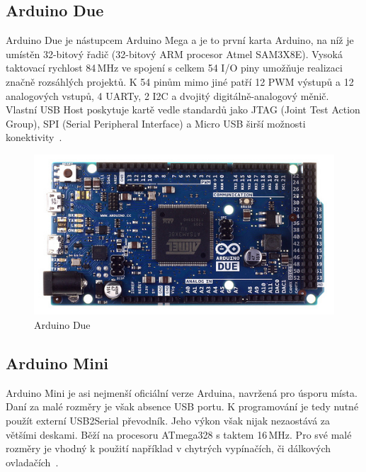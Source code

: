 		\subsection{Arduino Due} 
		Arduino Due je nástupcem Arduino Mega a je to první karta Arduino, na níž je umístěn 32-bitový řadič (32-bitový ARM procesor
		Atmel SAM3X8E). Vysoká taktovací rychlost 84\,MHz ve spojení s celkem 54 I/O piny umožňuje realizaci značně rozsáhlých projektů. K 54 pinům mimo jiné patří 12 PWM výstupů a 12 analogových vstupů, 4 UARTy, 2 I2C a dvojitý digitálně-analogový měnič. Vlastní USB Host poskytuje kartě vedle standardů jako JTAG (Joint Test Action Group), SPI (Serial Peripheral Interface) a Micro USB širší možnosti konektivity~\cite{ArduinoDue}.	
		
				\begin{figure}[!h]
  \begin{center}
    \includegraphics[scale=0.45]{obrazky/emded_arduino_due}
  \end{center}
  \caption{Arduino Due~\cite{ArduinoDue}}
\end{figure}

		\subsection{Arduino Mini} 
	Arduino Mini je asi nejmenší oficiální verze Arduina, navržená pro úsporu místa. Daní za malé rozměry je však absence USB portu. K programování je tedy nutné použít externí USB2Serial převodník. Jeho výkon však nijak nezaostává za většími deskami. Běží na procesoru ATmega328 s taktem 16\,MHz. Pro své malé rozměry je vhodný k použití například v chytrých vypínačích, či dálkových ovladačích~\cite{ArduinoMini}.	
	
